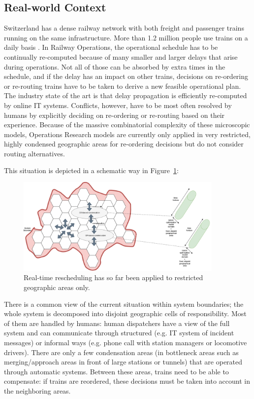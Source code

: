 \documentclass{article}
\begin{document}
\subsection{Real-world Context}
Switzerland has a dense railway network with both freight and passenger trains running on the same infrastructure. More than 1.2 million people use trains on a daily basis \cite{rcsbrochure}.
In Railway Operations, the operational schedule has to be continually re-computed because of many smaller and larger delays that arise during operations. Not all of those can be absorbed by extra times in the schedule, and if the delay has an impact on other trains, decisions on re-ordering or re-routing trains have to be taken to derive a new feasible operational plan. The industry state of the art is that delay propagation is efficiently re-computed by online IT systems. Conflicts, however, have to be most often resolved by humans by explicitly deciding on re-ordering or re-routing based on their experience. Because of the massive combinatorial complexity of these microscopic models, Operations Research models are currently only applied in very restricted, highly condensed geographic areas for re-ordering decisions but do not consider routing alternatives.



This situation is depicted in a schematic way in Figure~\ref{fig:introduction_compensation}:
%
\begin{figure}[hbtp]
	\centering
  \includegraphics[width=0.9\textwidth]{introduction_compensation.png}
	\caption{Real-time rescheduling has so far been applied to restricted geographic areas only.}
	\label{fig:introduction_compensation}
\end{figure}
%
There is a common view of the current situation within system boundaries; the whole system is decomposed into disjoint geographic cells of responsibility. Most of them are handled by humans: human dispatchers have a view of the full system and can communicate through structured (e.g. IT system of incident messages) or informal ways (e.g. phone call with station managers or locomotive drivers). There are only a few condensation areas \cite{caimi2009} (in bottleneck areas such as merging/approach areas in front of large stations or tunnels) that are operated through automatic systems. Between these areas, trains need to be able to compensate: if trains are reordered, these decisions must be taken into account in the neighboring areas.
\end{document}
